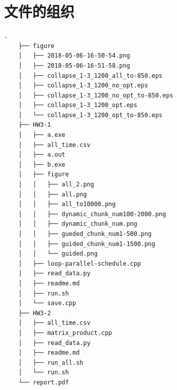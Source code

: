\documentclass[forprint]{myreport}
\begin{document}
\appendix

\chapter{文件的组织}

\begin{lstlisting}[style = c++]
    .
    ├── figure
    │   ├── 2018-05-06-16-50-54.png
    │   ├── 2018-05-06-16-51-58.png
    │   ├── collapse_1-3_1200_all_to-850.eps
    │   ├── collapse_1-3_1200_no_opt.eps
    │   ├── collapse_1-3_1200_no_opt_to-850.eps
    │   ├── collapse_1-3_1200_opt.eps
    │   └── collapse_1-3_1200_opt_to-850.eps
    ├── HW3-1
    │   ├── a.exe
    │   ├── all_time.csv
    │   ├── a.out
    │   ├── b.exe
    │   ├── figure
    │   │   ├── all_2.png
    │   │   ├── all.png
    │   │   ├── all_to10000.png
    │   │   ├── dynamic_chunk_num100-2000.png
    │   │   ├── dynamic_chunk_num.png
    │   │   ├── gueded_chunk_num1-500.png
    │   │   ├── guided_chunk_num1-1500.png
    │   │   └── guided.png
    │   ├── loop-parallel-schedule.cpp
    │   ├── read_data.py
    │   ├── readme.md
    │   ├── run.sh
    │   └── save.cpp
    ├── HW3-2
    │   ├── all_time.csv
    │   ├── matrix_product.cpp
    │   ├── read_data.py
    │   ├── readme.md
    │   ├── run_all.sh
    │   └── run.sh
    └── report.pdf
\end{lstlisting}


\cleardoublepage
\end{document}
